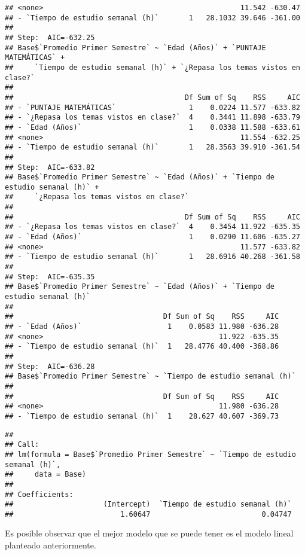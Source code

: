 \documentclass[
  man]{apa6}
\begin{document}
\begin{verbatim}
## <none>                                              11.542 -630.47
## - `Tiempo de estudio semanal (h)`       1   28.1032 39.646 -361.00
## 
## Step:  AIC=-632.25
## Base$`Promedio Primer Semestre` ~ `Edad (Años)` + `PUNTAJE MATEMÁTICAS` + 
##     `Tiempo de estudio semanal (h)` + `¿Repasa los temas vistos en clase?`
## 
##                                        Df Sum of Sq    RSS     AIC
## - `PUNTAJE MATEMÁTICAS`                 1    0.0224 11.577 -633.82
## - `¿Repasa los temas vistos en clase?`  4    0.3441 11.898 -633.79
## - `Edad (Años)`                         1    0.0338 11.588 -633.61
## <none>                                              11.554 -632.25
## - `Tiempo de estudio semanal (h)`       1   28.3563 39.910 -361.54
## 
## Step:  AIC=-633.82
## Base$`Promedio Primer Semestre` ~ `Edad (Años)` + `Tiempo de estudio semanal (h)` + 
##     `¿Repasa los temas vistos en clase?`
## 
##                                        Df Sum of Sq    RSS     AIC
## - `¿Repasa los temas vistos en clase?`  4    0.3454 11.922 -635.35
## - `Edad (Años)`                         1    0.0290 11.606 -635.27
## <none>                                              11.577 -633.82
## - `Tiempo de estudio semanal (h)`       1   28.6916 40.268 -361.58
## 
## Step:  AIC=-635.35
## Base$`Promedio Primer Semestre` ~ `Edad (Años)` + `Tiempo de estudio semanal (h)`
## 
##                                   Df Sum of Sq    RSS     AIC
## - `Edad (Años)`                    1    0.0583 11.980 -636.28
## <none>                                         11.922 -635.35
## - `Tiempo de estudio semanal (h)`  1   28.4776 40.400 -368.86
## 
## Step:  AIC=-636.28
## Base$`Promedio Primer Semestre` ~ `Tiempo de estudio semanal (h)`
## 
##                                   Df Sum of Sq    RSS     AIC
## <none>                                         11.980 -636.28
## - `Tiempo de estudio semanal (h)`  1    28.627 40.607 -369.73
\end{verbatim}

\begin{verbatim}
## 
## Call:
## lm(formula = Base$`Promedio Primer Semestre` ~ `Tiempo de estudio semanal (h)`, 
##     data = Base)
## 
## Coefficients:
##                     (Intercept)  `Tiempo de estudio semanal (h)`  
##                         1.60647                          0.04747
\end{verbatim}

Es posible observar que el mejor modelo que se puede tener es el modelo lineal planteado anteriormente.

\newpage
\end{document}
